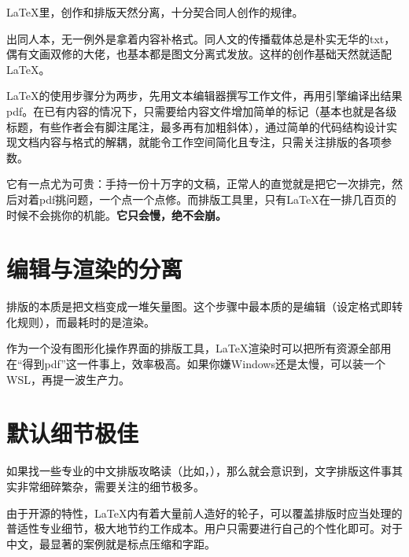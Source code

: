 \documentclass[10pt,openany]{book}
\begin{document}
\begin{sloppypar}
     {\LaTeX}里，创作和排版天然分离，十分契合同人创作的规律。

    出同人本，无一例外是拿着内容补格式。同人文的传播载体总是朴实无华的txt，偶有文画双修的大佬，也基本都是图文分离式发放。这样的创作基础天然就适配{\LaTeX}。

    {\LaTeX}的使用步骤分为两步，先用文本编辑器撰写工作文件，再用引擎编译出结果pdf。在已有内容的情况下，只需要给内容文件增加简单的标记（基本也就是各级标题，有些作者会有脚注尾注，最多再有加粗斜体），通过简单的代码结构设计实现文档内容与格式的解耦，就能令工作空间简化且专注，只需关注排版的各项参数。

    它有一点尤为可贵：手持一份十万字的文稿，正常人的直觉就是把它一次排完，然后对着pdf挑问题，一个点一个点修。而排版工具里，只有{\LaTeX}在一排几百页的时候不会挑你的机能。\textbf{它只会慢，绝不会崩。}

    \section{编辑与渲染的分离}

    排版的本质是把文档变成一堆矢量图。这个步骤中最本质的是编辑（设定格式即转化规则），而最耗时的是渲染。

    作为一个没有图形化操作界面的排版工具，{\LaTeX}渲染时可以把所有资源全部用在“得到pdf”这一件事上，效率极高。如果你嫌Windows还是太慢，可以装一个WSL，再提一波生产力。

    \section{默认细节极佳}

    如果找一些专业的中文排版攻略读（比如，），那么就会意识到，文字排版这件事其实非常细碎繁杂，需要关注的细节极多。

    由于开源的特性，{\LaTeX}内有着大量前人造好的轮子，可以覆盖排版时应当处理的普适性专业细节，极大地节约工作成本。用户只需要进行自己的个性化即可。对于中文，最显著的案例就是标点压缩和字距。


\end{sloppypar}
\end{document}
